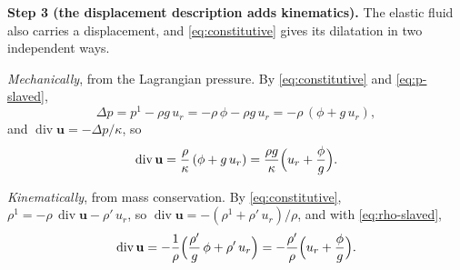 \documentclass[11pt]{article}
\newcommand{\bu}{\mathbf{u}}
\newcommand{\Div}{\operatorname{div}}
\begin{document}
\textbf{Step 3 (the displacement description adds kinematics).} The
elastic fluid also carries a displacement, and \eqref{eq:constitutive}
gives its dilatation in two independent ways.

\emph{Mechanically}, from the Lagrangian pressure. By
\eqref{eq:constitutive} and \eqref{eq:p-slaved},
\begin{equation}
  \Delta p = p^1 - \rho g\,u_r = -\rho\,\phi - \rho g\,u_r
  = -\rho\,(\phi + g\,u_r) ,
  \label{eq:dp-slaved}
\end{equation}
and $\Div\bu = -\Delta p/\kappa$, so
\begin{equation}
  \Div\bu = \frac{\rho}{\kappa}\,(\phi + g\,u_r)
  = \frac{\rho g}{\kappa}\Bigl(u_r + \frac{\phi}{g}\Bigr) .
  \label{eq:div-mech}
\end{equation}

\emph{Kinematically}, from mass conservation. By
\eqref{eq:constitutive}, $\rho^1 = -\rho\,\Div\bu - \rho'\,u_r$, so
$\Div\bu = -(\rho^1 + \rho'\,u_r)/\rho$, and with
\eqref{eq:rho-slaved},
\begin{equation}
  \Div\bu = -\frac{1}{\rho}\Bigl(\frac{\rho'}{g}\,\phi + \rho'\,u_r\Bigr)
  = -\frac{\rho'}{\rho}\Bigl(u_r + \frac{\phi}{g}\Bigr) .
  \label{eq:div-kin}
\end{equation}
\end{document}
